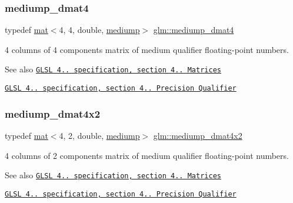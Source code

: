 \subsubsection{\texorpdfstring{mediump\+\_\+dmat4}{mediump\_dmat4}}
{\footnotesize\ttfamily typedef \mbox{\hyperlink{structglm_1_1mat}{mat}}$<$4, 4, double, \mbox{\hyperlink{namespaceglm_a36ed105b07c7746804d7fdc7cc90ff25a6416f3ea0c9025fb21ed50c4d6620482}{mediump}}$>$ \mbox{\hyperlink{group__core__precision_ga4b027f0f888d5ec1e77a00cb5517f56a}{glm\+::mediump\+\_\+dmat4}}}

4 columns of 4 components matrix of medium qualifier floating-\/point numbers.

\begin{DoxySeeAlso}{See also}
\href{http://www.opengl.org/registry/doc/GLSLangSpec.4.20.8.pdf}{\tt G\+L\+SL 4.. specification, section 4.. Matrices} 

\href{http://www.opengl.org/registry/doc/GLSLangSpec.4.20.8.pdf}{\tt G\+L\+SL 4.. specification, section 4.. Precision Qualifier} 
\end{DoxySeeAlso}
\mbox{\label{group__core__precision_ga0ef199d025bd14f9fc8f3ebd2b8daaa5}} 
\subsubsection{\texorpdfstring{mediump\+\_\+dmat4x2}{mediump\_dmat4x2}}
{\footnotesize\ttfamily typedef \mbox{\hyperlink{structglm_1_1mat}{mat}}$<$4, 2, double, \mbox{\hyperlink{namespaceglm_a36ed105b07c7746804d7fdc7cc90ff25a6416f3ea0c9025fb21ed50c4d6620482}{mediump}}$>$ \mbox{\hyperlink{group__core__precision_ga0ef199d025bd14f9fc8f3ebd2b8daaa5}{glm\+::mediump\+\_\+dmat4x2}}}

4 columns of 2 components matrix of medium qualifier floating-\/point numbers.

\begin{DoxySeeAlso}{See also}
\href{http://www.opengl.org/registry/doc/GLSLangSpec.4.20.8.pdf}{\tt G\+L\+SL 4.. specification, section 4.. Matrices} 

\href{http://www.opengl.org/registry/doc/GLSLangSpec.4.20.8.pdf}{\tt G\+L\+SL 4.. specification, section 4.. Precision Qualifier} 
\end{DoxySeeAlso}
\mbox{\label{group__core__precision_ga3c31b359e06498f36aae9bfde929a8ce}} 
